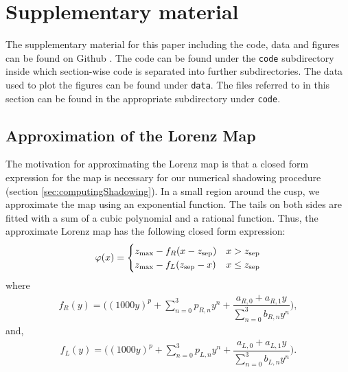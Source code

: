 

\section{Supplementary material}
The supplementary material for this paper including the code, data and figures can be found on Github \cite{supp}. The code can be found under the \verb+code+ subdirectory inside which section-wise code is separated into further subdirectories. The data used to plot the figures can be found under \verb+data+. The files referred to in this section can be found in the appropriate subdirectory under \verb+code+. 
\subsection{Approximation of the Lorenz Map}
\label{sec:lorenzMapApprox}
The motivation for approximating the Lorenz map is that a 
closed form expression for the map is necessary for our numerical shadowing procedure (section \ref{sec:computingShadowing}). In a small region around the cusp, we approximate the map using an exponential function. The tails on both sides are fitted with a sum of a cubic polynomial and a rational function. Thus, the approximate Lorenz map has the 
following closed form expression:
\begin{align}
    \varphi(x) = \begin{cases}
        z_{\rm max} - f_R(x - z_{\rm sep})   &  x > z_{\rm sep} \\
        z_{\rm max} -  f_L(z_{\rm sep} - x)   &  x \leq z_{\rm sep}
    \end{cases}
\end{align}
where 
\begin{align}
    f_R(y) = \Big( (1000 y)^p + 
        \sum_{n=0}^3 p_{R,n} y^n + \dfrac{a_{R,0} + a_{R,1} y}{\sum_{n=0}^3 b_{R,n} y^n}\Big),
\end{align}
and,
\begin{align}
    f_L(y) = \Big((1000 y)^p 
        + \sum_{n=0}^3 p_{L,n} y^n + \dfrac{a_{L,0} + a_{L,1}y}{\sum_{n=0}^3 b_{L,n} y^n}\Big).
\end{align}
